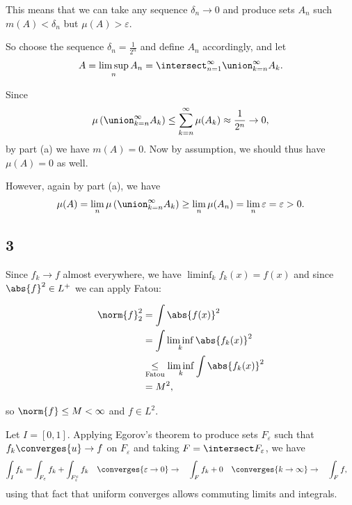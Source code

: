 This means that we can take any sequence \(\delta_n \to 0\) and produce
sets \(A_n\) such \(m(A) < \delta_n\) but \(\mu(A) > \varepsilon\).

So choose the sequence \(\delta_n = \frac 1 {2^n}\) and define \(A_n\)
accordingly, and let \begin{align*}
A = \limsup_n A_n = \intersect_{n=1}^\infty \union_{k = n}^\infty A_k
.\end{align*}

Since
\begin{align*}
\mu\left( \union_{k=n}^\infty A_k \right) \leq \sum_{k=n}^\infty \mu(A_k) \approx \frac {1}{2^n} \to 0,
\end{align*} by part (a) we have \(m(A) = 0\). Now by assumption, we
should thus have \(\mu(A) = 0\) as well.

However, again by part (a), we have \begin{align*}
\mu(A) = \lim_n \mu\left( \union_{k=n}^\infty A_k \right)
\geq \lim_n \mu(A_n) = \lim_n \varepsilon = \varepsilon > 0
.\end{align*}

\hypertarget{section-2}{%
\subsection{3}\label{section-2}}

Since \(f_k \to f\) almost everywhere, we have
\(\liminf_k f_k(x) = f(x)\) and since \(\abs{f}^2 \in L^+\) we can apply
Fatou:

\begin{align*}
\norm{f}_2^2
&= \int \abs{f(x)}^2  \\
&= \int \liminf_k \abs{f_k(x)}^2 \\
&\underset{\text{Fatou}}\leq\liminf_k \int \abs{f_k(x)}^2 \\
&= M^2
,\end{align*}

so \(\norm{f} \leq M < \infty\) and \(f\in L^2\).

Let \(I = [0, 1]\). Applying Egorov's theorem to produce sets
\(F_\varepsilon\) such that \(f_k\converges{u}\to f\) on
\(F_\varepsilon\) and taking \(F = \intersect F_\varepsilon\), we have
\begin{align*}
\int_I f_k 
&= \int_{F_\varepsilon}f_k + \int_{F_\varepsilon^c} f_k 
\quad \converges{\varepsilon \to 0}\to \quad 
\int_F f_k + 0 
\quad  \converges{k\to\infty}\to \quad 
\int_F f
,\end{align*} using that fact that uniform converges allows commuting
limits and integrals.

